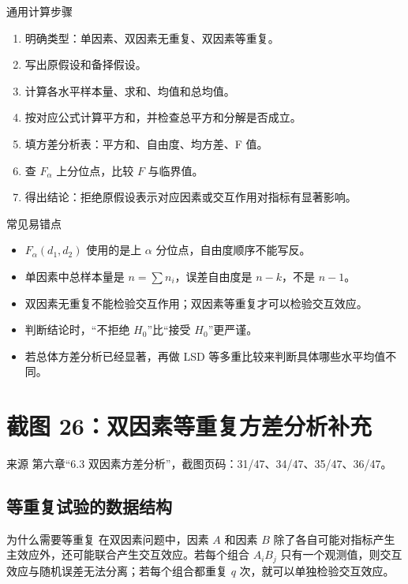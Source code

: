 \documentclass[UTF8,zihao=-4,fontset=fandol]{ctexart}
\begin{document}
\begin{methodbox}{通用计算步骤}
\begin{enumerate}
  \item 明确类型：单因素、双因素无重复、双因素等重复。
  \item 写出原假设和备择假设。
  \item 计算各水平样本量、求和、均值和总均值。
  \item 按对应公式计算平方和，并检查总平方和分解是否成立。
  \item 填方差分析表：平方和、自由度、均方差、F 值。
  \item 查 $F_{\alpha}$ 上分位点，比较 $F$ 与临界值。
  \item 得出结论：拒绝原假设表示对应因素或交互作用对指标有显著影响。
\end{enumerate}
\end{methodbox}

\begin{warnbox}{常见易错点}
\begin{itemize}
  \item $F_{\alpha}(d_1,d_2)$ 使用的是上 $\alpha$ 分位点，自由度顺序不能写反。
  \item 单因素中总样本量是 $n=\sum n_i$，误差自由度是 $n-k$，不是 $n-1$。
  \item 双因素无重复不能检验交互作用；双因素等重复才可以检验交互效应。
  \item 判断结论时，“不拒绝 $H_0$”比“接受 $H_0$”更严谨。
  \item 若总体方差分析已经显著，再做 LSD 等多重比较来判断具体哪些水平均值不同。
\end{itemize}
\end{warnbox}

\section{截图 26：双因素等重复方差分析补充}

\begin{sourcebox}{来源}
第六章“6.3 双因素方差分析”，截图页码：31/47、34/47、35/47、36/47。
\end{sourcebox}

\subsection{等重复试验的数据结构}

\begin{keybox}{为什么需要等重复}
在双因素问题中，因素 $A$ 和因素 $B$ 除了各自可能对指标产生主效应外，还可能联合产生交互效应。若每个组合 $A_iB_j$ 只有一个观测值，则交互效应与随机误差无法分离；若每个组合都重复 $q$ 次，就可以单独检验交互效应。
\end{keybox}
\end{document}
